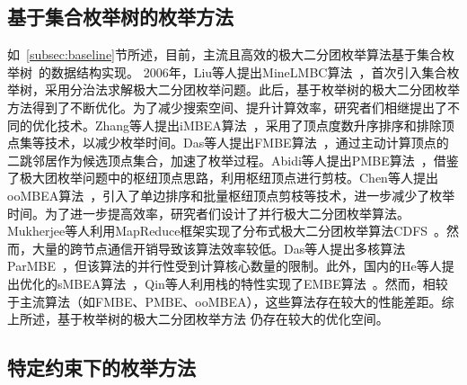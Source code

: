 

\subsection{基于集合枚举树的枚举方法}

如~\ref{subsec:baseline}节所述，目前，主流且高效的极大二分团枚举算法基于集合枚举树~\cite{SEtree92}的数据结构实现。
2006年，Liu等人提出MineLMBC算法~\cite{minel06}，首次引入集合枚举树，采用分治法求解极大二分团枚举问题。此后，基于枚举树的极大二分团枚举方法得到了不断优化。为了减少搜索空间、提升计算效率，研究者们相继提出了不同的优化技术。Zhang等人提出iMBEA算法~\cite{iMBEA14}，采用了顶点度数升序排序和排除顶点集等技术，以减少枚举时间。Das等人提出FMBE算法~\cite{parMBE19}，通过主动计算顶点的二跳邻居作为候选顶点集合，加速了枚举过程。Abidi等人提出PMBE算法~\cite{PMBE20}，借鉴了极大团枚举问题中的枢纽顶点思路，利用枢纽顶点进行剪枝。Chen等人提出ooMBEA算法~\cite{ooMBE22}，引入了单边排序和批量枢纽顶点剪枝等技术，进一步减少了枚举时间。为了进一步提高效率，研究者们设计了并行极大二分团枚举算法。Mukherjee等人利用MapReduce框架实现了分布式极大二分团枚举算法CDFS~\cite{mapreduceMBE16}。然而，大量的跨节点通信开销导致该算法效率较低。Das等人提出多核算法ParMBE~\cite{parMBE19}，但该算法的并行性受到计算核心数量的限制。此外，国内的He等人提出优化的sMBEA算法~\cite{MBEHe18,MBEchinese19}，Qin等人利用栈的特性实现了EMBE算法~\cite{MBEQin20}。然而，相较于主流算法（如FMBE、PMBE、ooMBEA），这些算法存在较大的性能差距。综上所述，基于枚举树的极大二分团枚举方法
仍存在较大的优化空间。

\subsection{特定约束下的枚举方法}

